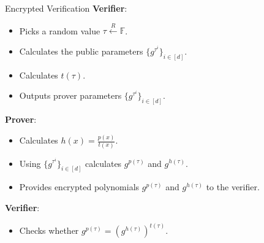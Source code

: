 \documentclass{zkdl-presentation-template}
\begin{document}
    \begin{frame}{Encrypted Verification}
        \textbf{Verifier}: 
        \vspace{-5pt}
        \begin{itemize}[label=]
            \item \vspace{-3pt} Picks a random value $\tau \xleftarrow{R} \mathbb{F}$. \pause
            \item \vspace{-3pt} Calculates the public parameters $\{g^{\tau^i}\}_{i \in [d]}$. \pause
            \item \vspace{-3pt} Calculates $t(\tau)$. \pause
            \item \vspace{-3pt} Outputs prover parameters $\{g^{\tau^i}\}_{i \in [d]}$. \pause
        \end{itemize}
        \textbf{Prover}: 
        \vspace{-5pt}
        \begin{itemize}[label=]
            \item \vspace{-3pt} Calculates $h(x) = \frac{p(x)}{t(x)}$. \pause
            \item \vspace{-3pt} Using $\{g^{\tau^i}\}_{i \in [d]}$ calculates $g^{p(\tau)}$ and $g^{h(\tau)}$. \pause
            \item \vspace{-3pt} Provides encrypted polynomials $g^{p(\tau)}$ and $g^{h(\tau)}$ to the verifier. \pause
        \end{itemize}
        \textbf{Verifier}: 
        \vspace{-5pt}
        \begin{itemize}[label=]
            \item \vspace{-3pt} Checks whether $g^{p(\tau)} = \left( g^{h(\tau)} \right)^{t(\tau)}$.
        \end{itemize}
    \end{frame}
\end{document}
